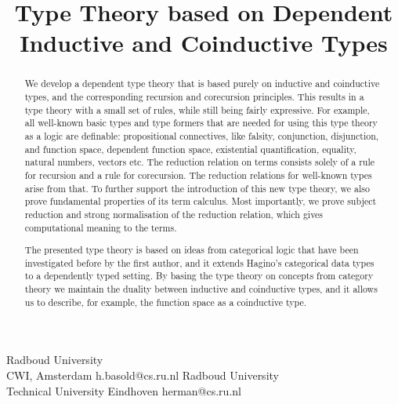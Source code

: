 \documentclass[preprint]{sigplanconf}
\begin{document}
\setlength{\pdfpageheight}{\paperheight}
\setlength{\pdfpagewidth}{\paperwidth}






\title{Type Theory based on Dependent Inductive and Coinductive Types}

           {Radboud University \\ CWI, Amsterdam}
           {h.basold@cs.ru.nl}
           {Radboud University \\ Technical University Eindhoven}
           {herman@cs.ru.nl}

\maketitle

\begin{abstract}
  We develop a dependent type theory that is based purely on inductive
  and coinductive types, and the corresponding recursion and
  corecursion principles.
  This results in a type theory with a small set of rules, while still being
  fairly expressive.
  For example, all well-known basic types and type formers that are needed for
  using this type theory as a logic are definable: propositional
  connectives, like falsity, conjunction, disjunction, and function space,
  dependent function space, existential quantification, equality,
  natural numbers, vectors etc.
  The reduction relation on terms consists solely of a rule for recursion and a
  rule for corecursion.
  The reduction relations for well-known types arise from that.
  To further support the introduction of this new type theory, we also
  prove fundamental properties of its term calculus.
  Most importantly, we prove subject reduction and strong normalisation of
  the reduction relation, which gives computational meaning to the terms.

  The presented type theory is based on
  ideas from categorical logic that have been investigated before by
  the first author, and it extends Hagino's categorical data types to
  a dependently typed setting.
  By basing the type theory on concepts from category theory we maintain the
  duality between inductive and coinductive types, and it allows us to describe,
  for example, the function space as a coinductive type.
\end{abstract}
\end{document}
